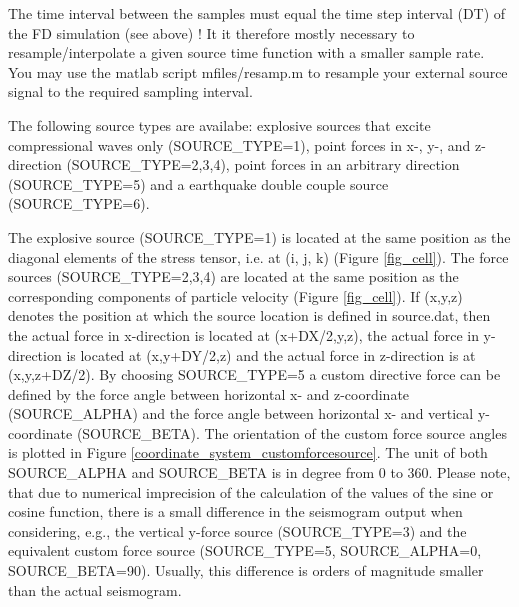 \documentclass{hitec}
\begin{document}
The time interval between the samples must equal the time step interval (DT) of the FD simulation (see above) ! It it therefore mostly necessary to resample/interpolate a given source time function with a smaller sample rate. You may use the matlab script mfiles/resamp.m to resample your external source signal to the required sampling interval.

The following source types are availabe: explosive sources that excite compressional waves
only (SOURCE\_TYPE=1), point forces in x-, y-, and z-direction (SOURCE\_TYPE=2,3,4), point forces in an arbitrary direction (SOURCE\_TYPE=5) and a earthquake double couple source (SOURCE\_TYPE=6).

The explosive source (SOURCE\_TYPE=1) is located at the same position as the diagonal elements of the stress tensor, i.e. at (i, j, k) (Figure \ref{fig_cell}).
The force sources (SOURCE\_TYPE=2,3,4) are located at the same position as the corresponding components of particle velocity (Figure \ref{fig_cell}). If (x,y,z) denotes the position at which the source location is defined in source.dat, then the actual force in x-direction is located at (x+DX/2,y,z), the actual force in y-direction is located at (x,y+DY/2,z) and the actual force in z-direction is at (x,y,z+DZ/2). 
By choosing SOURCE\_TYPE=5 a custom directive force can be defined by the force angle between horizontal x- and z-coordinate (SOURCE\_ALPHA) and the force angle between horizontal x- and vertical y-coordinate (SOURCE\_BETA). The orientation of the custom force source angles is plotted in Figure \ref{coordinate_system_customforcesource}. The unit of both SOURCE\_ALPHA and SOURCE\_BETA is in degree from 0 to 360. Please note, that due to numerical imprecision of the calculation of the values of the sine or cosine function, there is a small difference in the seismogram output when considering, e.g., the vertical y-force source (SOURCE\_TYPE=3) and the equivalent custom force source (SOURCE\_TYPE=5, SOURCE\_ALPHA=0, SOURCE\_BETA=90). Usually, this difference is orders of magnitude smaller than the actual seismogram.
\end{document}
